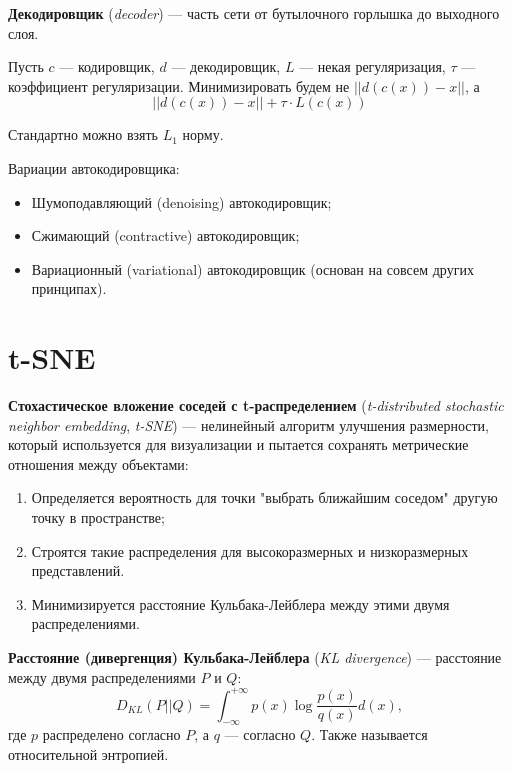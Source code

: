 \begin{definition}
    \textbf{Декодировщик} (\textit{decoder}) --- часть сети от бутылочного горлышка до выходного слоя.
\end{definition}

Пусть $c$ --- кодировщик, $d$ --- декодировщик, $L$ --- некая регуляризация, $\tau$ --- коэффициент регуляризации. Минимизировать будем не $||d(c(x))-x||$, а
\[
    ||d(c(x))-x||+\tau\cdot L(c(x))
\]

\begin{remark}
    Стандартно можно взять $L_1$ норму.
\end{remark}

Вариации автокодировщика:
\begin{itemize}
    \item Шумоподавляющий (denoising) автокодировщик;
    \item Сжимающий (contractive) автокодировщик;
    \item Вариационный (variational) автокодировщик (основан на совсем других принципах).
\end{itemize}

\section{t-SNE}

\begin{definition}
    \textbf{Стохастическое вложение соседей с t-распределением} (\textit{t-distributed stochastic neighbor embedding}, \textit{t-SNE}) --- нелинейный алгоритм улучшения размерности, который используется для визуализации и пытается сохранять метрические отношения между объектами:
    \begin{enumerate}
        \item Определяется вероятность для точки "выбрать ближайшим соседом" другую точку в пространстве;
        \item Строятся такие распределения для высокоразмерных и низкоразмерных представлений.
        \item Минимизируется расстояние Кульбака-Лейблера между этими двумя распределениями.
    \end{enumerate}
\end{definition}

\begin{definition}
    \textbf{Расстояние (дивергенция) Кульбака-Лейблера} (\textit{KL divergence}) --- расстояние между двумя распределениями $P$ и $Q$:
    \[
        D_{KL}(P||Q)=\int_{-\infty}^{+\infty}p(x)\log\dfrac{p(x)}{q(x)}d(x),
    \]
    где $p$ распределено согласно $P$, а $q$ --- согласно $Q$. Также называется относительной энтропией.
\end{definition}

